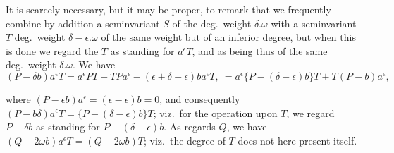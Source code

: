\documentclass[11pt]{article}
\begin{document}
It is scarcely necessary, but it may be proper, to remark that we frequently combine by addition a seminvariant $S$ of the deg.\ weight $\delta . \omega$ with a seminvariant $T$ deg.\ weight $\delta - \epsilon . \omega$ of the same weight but of an inferior degree, but when this is done we regard the $T$ as standing for $a^\epsilon T$, and as being thus of the same deg.\ weight $\delta . \omega$. We have
\[
(P - \delta b) a^\epsilon T = a^\epsilon PT + TPa^\epsilon - (\epsilon + \delta - \epsilon) b a^\epsilon T,\ = a^\epsilon \{P - (\delta - \epsilon) b\} T + T(P - b)a^\epsilon,
\]

\clearpage
where $(P - \epsilon b) a^\epsilon = (\epsilon - \epsilon) b = 0$, and consequently $(P - b\delta) a^\epsilon T = \{P - (\delta - \epsilon) b\} T$; viz.\ for the operation upon $T$, we regard $P - \delta b$ as standing for $P - (\delta - \epsilon) b$. As regards $Q$, we have $(Q - 2\omega b) a^\epsilon T = (Q - 2\omega b)T$; viz.\ the degree of $T$ does not here present itself.
\end{document}
